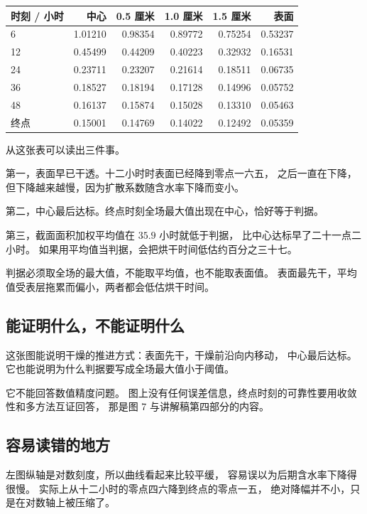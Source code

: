 \documentclass[11pt,a4paper]{article}
\begin{document}
\begin{center}
\begin{tabular}{@{}lrrrrr@{}}
\toprule
时刻 / 小时 & 中心 & 0.5 厘米 & 1.0 厘米 & 1.5 厘米 & 表面 \\
\midrule
6 & 1.01210 & 0.98354 & 0.89772 & 0.75254 & 0.53237 \\
12 & 0.45499 & 0.44209 & 0.40223 & 0.32932 & 0.16531 \\
24 & 0.23711 & 0.23207 & 0.21614 & 0.18511 & 0.06735 \\
36 & 0.18527 & 0.18194 & 0.17128 & 0.14996 & 0.05752 \\
48 & 0.16137 & 0.15874 & 0.15028 & 0.13310 & 0.05463 \\
终点 & 0.15001 & 0.14769 & 0.14022 & 0.12492 & 0.05359 \\
\bottomrule
\end{tabular}
\end{center}

从这张表可以读出三件事。

第一，表面早已干透。十二小时时表面已经降到零点一六五，
之后一直在下降，但下降越来越慢，因为扩散系数随含水率下降而变小。

第二，中心最后达标。终点时刻全场最大值出现在中心，恰好等于判据。

第三，截面面积加权平均值在 $35.9$ 小时就低于判据，
比中心达标早了二十一点二小时。
如果用平均值当判据，会把烘干时间低估约百分之三十七。

\begin{keypoint}
判据必须取全场的最大值，不能取平均值，也不能取表面值。
表面最先干，平均值受表层拖累而偏小，两者都会低估烘干时间。
\end{keypoint}

\subsection{能证明什么，不能证明什么}

这张图能说明干燥的推进方式：表面先干，干燥前沿向内移动，
中心最后达标。它也能说明为什么判据要写成全场最大值小于阈值。

它不能回答数值精度问题。
图上没有任何误差信息，终点时刻的可靠性要用收敛性和多方法互证回答，
那是图 7 与讲解稿第四部分的内容。

\subsection{容易读错的地方}

左图纵轴是对数刻度，所以曲线看起来比较平缓，
容易误以为后期含水率下降得很慢。
实际上从十二小时的零点四六降到终点的零点一五，
绝对降幅并不小，只是在对数轴上被压缩了。
\end{document}
